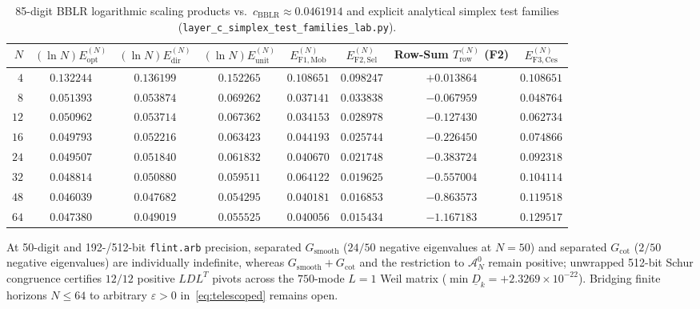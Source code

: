 \documentclass[11pt,a4paper]{article}
\theoremstyle{definition}
\begin{document}
\begin{table}[ht]
\centering
\caption{85-digit BBLR logarithmic scaling products vs.\ $c_{\mathrm{BBLR}} \approx 0.0461914$ and explicit analytical simplex test families (\texttt{layer\_c\_\allowbreak simplex\_\allowbreak test\_\allowbreak families\_\allowbreak lab.py}).}
\label{tab:bblr_scaling}
\vspace{4pt}
\scriptsize
\begin{tabular}{@{}rccccccc@{}}
\toprule
$N$ & $(\ln N) E_{\mathrm{opt}}^{(N)}$ & $(\ln N) E_{\mathrm{dir}}^{(N)}$ & $(\ln N) E_{\mathrm{unit}}^{(N)}$ & $E_{\mathrm{F1,Mob}}^{(N)}$ & $E_{\mathrm{F2,Sel}}^{(N)}$ & Row-Sum $T_{\mathrm{row}}^{(N)}$ (F2) & $E_{\mathrm{F3,Ces}}^{(N)}$ \\
\midrule
$4$  & $0.132244$ & $0.136199$ & $0.152265$ & $0.108651$ & $0.098247$ & $+0.013864$ & $0.108651$ \\
$8$  & $0.051393$ & $0.053874$ & $0.069262$ & $0.037141$ & $0.033838$ & $-0.067959$ & $0.048764$ \\
$12$ & $0.050962$ & $0.053714$ & $0.067362$ & $0.034153$ & $0.028978$ & $-0.127430$ & $0.062734$ \\
$16$ & $0.049793$ & $0.052216$ & $0.063423$ & $0.044193$ & $0.025744$ & $-0.226450$ & $0.074866$ \\
$24$ & $0.049507$ & $0.051840$ & $0.061832$ & $0.040670$ & $0.021748$ & $-0.383724$ & $0.092318$ \\
$32$ & $0.048814$ & $0.050880$ & $0.059511$ & $0.064122$ & $0.019625$ & $-0.557004$ & $0.104114$ \\
$48$ & $0.046039$ & $0.047682$ & $0.054295$ & $0.040181$ & $0.016853$ & $-0.863573$ & $0.119518$ \\
$64$ & $0.047380$ & $0.049019$ & $0.055525$ & $0.040056$ & $0.015434$ & $-1.167183$ & $0.129517$ \\
\bottomrule
\end{tabular}
\end{table}

At 50-digit and 192-/512-bit \texttt{flint.arb} precision, separated $G_{\mathrm{smooth}}$ ($24/50$ negative eigenvalues at $N=50$) and separated $G_{\mathrm{cot}}$ ($2/50$ negative eigenvalues) are individually indefinite, whereas $G_{\mathrm{smooth}}+G_{\mathrm{cot}}$ and the restriction to $\mathcal{A}_N^0$ remain positive; unwrapped 512-bit Schur congruence certifies $12/12$ positive $LDL^T$ pivots across the $750$-mode $L=1$ Weil matrix ($\min \underline{D}_k = +2.3269 \times 10^{-22}$). Bridging finite horizons $N \le 64$ to arbitrary $\varepsilon > 0$ in~\eqref{eq:telescoped} remains open.
\end{document}
